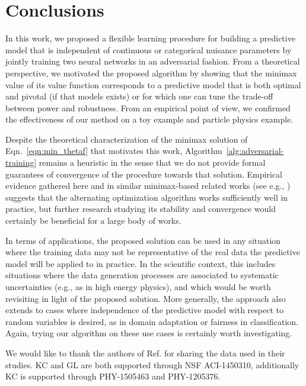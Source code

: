 \documentclass[twocolumn,superscriptaddress,aps]{revtex4-1}
\theoremstyle{plain}
\begin{document}
\section{Conclusions}
\label{sec:conclusions}

In this work, we proposed a flexible learning procedure for building a
predictive model that is independent of continuous or categorical nuisance
parameters by jointly training two neural networks in an adversarial fashion.
From a theoretical perspective, we motivated the proposed algorithm by showing
that the minimax value  of its value function corresponds to a predictive model
that is both optimal and pivotal (if that models exists) or for which one can
tune the trade-off between power and robustness. From an empirical point of
view, we confirmed the effectiveness of our method on a toy example and particle physics example.

Despite the theoretical characterization of the minimax solution of Eqn.~\ref{eqn:min_thetaf}
that motivates this work,
Algorithm~\ref{alg:adversarial-training} remains a heuristic in the sense
that we do not provide formal guarantees of convergence of the procedure towards
that solution. Empirical evidence gathered here and in similar minimax-based
related works (see e.g., \citep{goodfellow2014generative,EdwardsS15}) suggests
that the alternating optimization algorithm works sufficiently well in practice,
but further research studying its stability and convergence would certainly
be beneficial for a large body of works.

In terms of applications, the proposed solution can be used in any situation
where the training data may not be representative of the real data the
predictive model will be applied to in practice. In the scientific context, this
includes situations where the data generation processes are associated to
systematic uncertainties (e.g., as in high energy physics), and which would be
worth revisiting in light of the proposed solution. More generally, the approach
also extends to cases where independence of the predictive model with respect to
random variables is desired, as in domain adaptation or fairness in
classification. Again, trying our algorithm on these use cases is certainly
worth investigating.

\bigskip


\begin{acknowledgments}

    We would like to thank the authors of Ref.\citep{baldi2016jet} for sharing the data used in their
    studies.
    KC and GL are both supported through NSF ACI-1450310, additionally KC is supported
    through PHY-1505463 and PHY-1205376. 

\end{acknowledgments}


\vfill





\vfill
\end{document}
